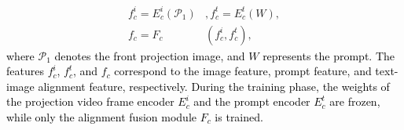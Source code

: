 \begin{equation}
\begin{aligned}
     f_{c}^{i}  = E_{c}^{i} (\mathcal{P}_{1}) &, f_{c}^{t}  = E_{c}^{t}(W), \\
     f_{c}  = F_{c}& ( f_{c}^{i} , f_{c}^{t} ),
\end{aligned}
\end{equation}
\textcolor{black}{where $\mathcal{P}_{1}$ denotes the front projection image, and $W$ represents the prompt. The features $f_{c}^{i}$, $f_{c}^{t}$, and $f_{c}$ correspond to the image feature, prompt feature, and text-image alignment feature, respectively. During the training phase, the weights of the projection video frame encoder $E_{c}^{i}$ and the prompt  encoder $E_{c}^{t}$ are frozen, while only the alignment fusion module $F_{c}$ is trained.}




